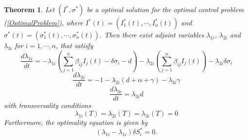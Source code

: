 \documentclass[a4paper,10pt]{article}
\newtheorem{thm}{Theorem}[section]
\theoremstyle{remark}
\begin{document}
\begin{thm}
Let $(I^{*}, \sigma^{*})$ be a optimal solution for the optimal control problem (\ref{OptimalProblem}), where $I^{*}(t)=(I_{1}^{*}(t),\cdots, I_{n}^{*}(t))$ and $\sigma^{*}(t)=(\sigma_{1}^{*}(t),\cdots, \sigma_{n}^{*}(t))$. Then there exist adjoint variables $\lambda_{1i}$, $\lambda_{2i}$ and $\lambda_{3i}$ for $i=1,\cdots, n$, that satisfy
\begin{equation}\label{lambda1}
\frac{d\lambda_{1i}}{dt}=-\lambda_{1i}\left(\sum_{j=1}^{n} \beta_{i j} I_{j}(t)-\delta\sigma_{i}-d\right)-\lambda_{2i}\left(\sum_{j=1}^{n} \beta_{i j} I_{j}(t)\right)-\lambda_{3i}\delta\sigma_{i}
\end{equation}
\begin{equation}\label{lambda2}
\frac{d\lambda_{2i}}{dt}=-1-\lambda_{2i}\left(d+\alpha+\gamma\right)-\lambda_{3i}\gamma 
\end{equation}
\begin{equation}\label{lambda3}
\frac{d\lambda_{3i}}{dt}=\lambda_{3i}d
\end{equation}
with transversality conditions
\begin{equation}\label{transver}
\lambda_{1i}(T)=\lambda_{2i}(T)=\lambda_{3i}(T)=0
\end{equation}
Furthermore, the optimality equation is given by
\begin{equation}\label{OptimalityEquation}
(\lambda_{1i}-\lambda_{1i})\delta S_{i}^{*}=0.
\end{equation}
\end{thm}
\end{document}
